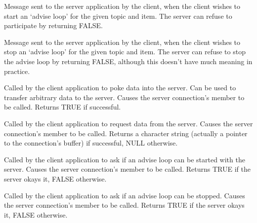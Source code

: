 Message sent to the server application by the client, when the client
wishes to start an `advise loop' for the given topic and item. The
server can refuse to participate by returning FALSE.

\label{wxddeconnectiononstopadvise}


Message sent to the server application by the client, when the client
wishes to stop an `advise loop' for the given topic and item. The
server can refuse to stop the advise loop by returning FALSE, although
this doesn't have much meaning in practice.

\label{wxddeconnectionpoke}


Called by the client application to poke data into the server. Can be
used to transfer arbitrary data to the server. Causes the server
connection's  member
to be called. Returns TRUE if successful.

\label{wxddeconnectionrequest}


Called by the client application to request data from the server. Causes
the server connection's  member to be called. Returns a
character string (actually a pointer to the connection's buffer) if
successful, NULL otherwise.

\label{wxddeconnectionstartadvise}


Called by the client application to ask if an advise loop can be started
with the server. Causes the server connection's \rtfsp
member to be called. Returns TRUE if the server okays it, FALSE
otherwise.

\label{wxddeconnectionstopadvise}


Called by the client application to ask if an advise loop can be
stopped. Causes the server connection's  member
to be called. Returns TRUE if the server okays it, FALSE otherwise.


